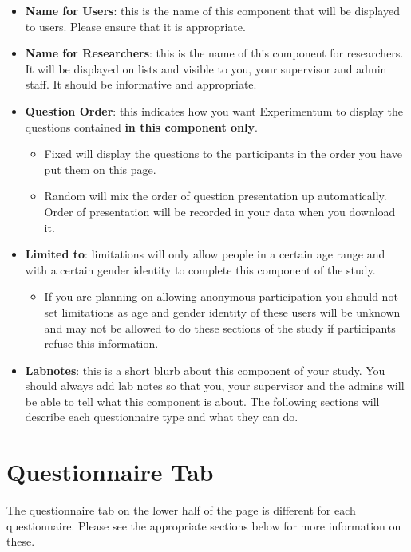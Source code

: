\documentclass[]{book}
\providecommand{\tightlist}{%
  \setlength{\itemsep}{0pt}\setlength{\parskip}{0pt}}
\begin{document}
\begin{itemize}
\tightlist
\item
  \textbf{Name for Users}: this is the name of this component that will
  be displayed to users. Please ensure that it is appropriate.
\item
  \textbf{Name for Researchers}: this is the name of this component for
  researchers. It will be displayed on lists and visible to you, your
  supervisor and admin staff. It should be informative and appropriate.
\item
  \textbf{Question Order}: this indicates how you want Experimentum to
  display the questions contained \textbf{in this component only}.

  \begin{itemize}
  \tightlist
  \item
    Fixed will display the questions to the participants in the order
    you have put them on this page.
  \item
    Random will mix the order of question presentation up automatically.
    Order of presentation will be recorded in your data when you
    download it.
  \end{itemize}
\item
  \textbf{Limited to}: limitations will only allow people in a certain
  age range and with a certain gender identity to complete this
  component of the study.

  \begin{itemize}
  \tightlist
  \item
    If you are planning on allowing anonymous participation you should
    not set limitations as age and gender identity of these users will
    be unknown and may not be allowed to do these sections of the study
    if participants refuse this information.
  \end{itemize}
\item
  \textbf{Labnotes}: this is a short blurb about this component of your
  study. You should always add lab notes so that you, your supervisor
  and the admins will be able to tell what this component is about. The
  following sections will describe each questionnaire type and what they
  can do.
\end{itemize}

\section{Questionnaire Tab}\label{questionnaire-tab}

The questionnaire tab on the lower half of the page is different for
each questionnaire. Please see the appropriate sections below for more
information on these.
\end{document}
